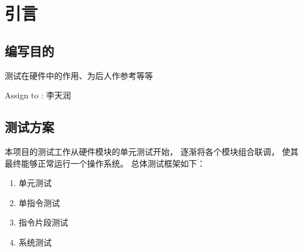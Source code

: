 \section{引言}
    \subsection{编写目的}
        测试在硬件中的作用、为后人作参考等等

        Assign to : 李天润

    \subsection{测试方案}
        本项目的测试工作从硬件模块的单元测试开始，%
        逐渐将各个模块组合联调，%
        使其最终能够正常运行一个操作系统。%
        总体测试框架如下：
        \begin{enumerate}
        \item
            单元测试
        \item
            单指令测试
        \item
            指令片段测试
        \item
            系统测试
        \end{enumerate}